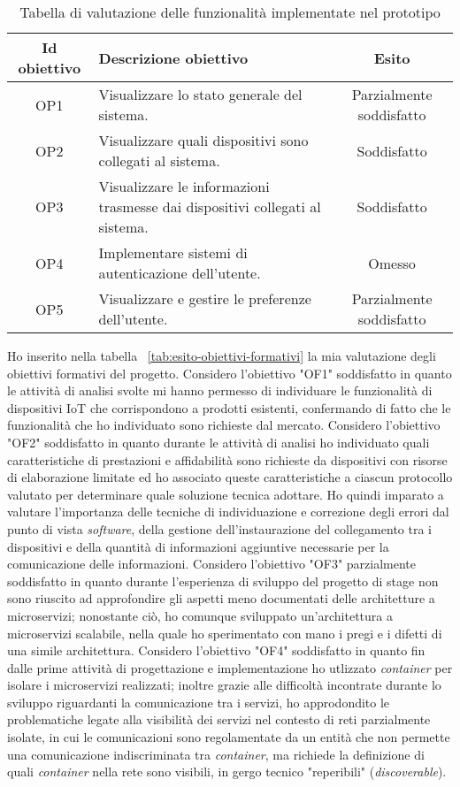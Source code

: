 \begin{table}[H]
\caption{Tabella di valutazione delle funzionalità implementate nel prototipo}
\label{tab:esito-obiettivi-prodotto}
\begin{tabularx}{\linewidth}{|c|X|c|}
\hline
\textbf{Id obiettivo} & \textbf{Descrizione obiettivo} & \textbf{Esito}\\
\hline
OP1 & Visualizzare lo stato generale del sistema. & Parzialmente soddisfatto \\
\hline
OP2 & Visualizzare quali dispositivi sono collegati al sistema. & Soddisfatto \\
\hline
OP3 & Visualizzare le informazioni trasmesse dai dispositivi collegati al sistema. & Soddisfatto \\
\hline
OP4 & Implementare sistemi di autenticazione dell'utente. & Omesso \\
\hline
OP5 & Visualizzare e gestire le preferenze dell'utente. & Parzialmente soddisfatto \\
\hline
\end{tabularx}
\end{table}

Ho inserito nella tabella ~\ref{tab:esito-obiettivi-formativi} la mia valutazione degli obiettivi formativi del progetto.
Considero l'obiettivo "OF1" soddisfatto in quanto le attività di analisi svolte mi hanno permesso di individuare le funzionalità di dispositivi IoT che corrispondono a prodotti esistenti, confermando di fatto che le funzionalità che ho individuato sono richieste dal mercato.
Considero l'obiettivo "OF2" soddisfatto in quanto durante le attività di analisi ho individuato quali caratteristiche di prestazioni e affidabilità sono richieste da dispositivi con risorse di elaborazione limitate ed ho associato queste caratteristiche a ciascun protocollo valutato per determinare quale soluzione tecnica adottare. Ho quindi imparato a valutare l'importanza delle tecniche di individuazione e correzione degli errori dal punto di vista \emph{software}, della gestione dell'instaurazione del collegamento tra i dispositivi e della quantità di informazioni aggiuntive necessarie per la comunicazione delle informazioni.
Considero l'obiettivo "OF3" parzialmente soddisfatto in quanto durante l'esperienza di sviluppo del progetto di stage non sono riuscito ad approfondire gli aspetti meno documentati delle architetture a microservizi; nonostante ciò, ho comunque sviluppato un'architettura a microservizi scalabile, nella quale ho sperimentato con mano i pregi e i difetti di una simile architettura.
Considero l'obiettivo "OF4" soddisfatto in quanto fin dalle prime attività di progettazione e implementazione ho utlizzato \emph{container} per isolare i microservizi realizzati; inoltre grazie alle difficoltà incontrate durante lo sviluppo riguardanti la comunicazione tra i servizi, ho approdondito le problematiche legate alla visibilità dei servizi nel contesto di reti parzialmente isolate, in cui le comunicazioni sono regolamentate da un entità che non permette una comunicazione indiscriminata tra \emph{container}, ma richiede la definizione di quali \emph{container} nella rete sono visibili, in gergo tecnico "reperibili" (\emph{discoverable}).  

